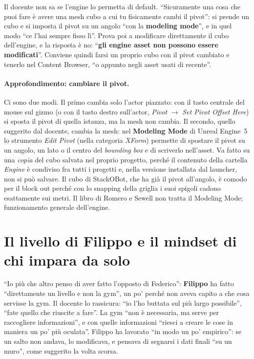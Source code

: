 Il docente non sa se l'engine lo permetta di default. ``Sicuramente una cosa che puoi fare è
avere una mesh cubo a cui tu fisicamente cambi il pivot'': si prende un cubo e si imposta il
pivot su un angolo ``con la \textbf{modeling mode}'', e in quel modo ``ce l'hai sempre fisso
lì''. Prova poi a modificare direttamente il cubo dell'engine, e la risposta è no: ``\textbf{gli
engine asset non possono essere modificati}''. Conviene quindi farsi un proprio cubo con il
pivot cambiato e tenerlo nel Content Browser, ``o appunto negli asset usati di recente''.

\paragraph{Approfondimento: cambiare il pivot.} Ci sono due modi. Il primo cambia solo
l'actor piazzato: con il tasto centrale del mouse sul gizmo (o con il tasto destro
sull'actor, \emph{Pivot} $\rightarrow$ \emph{Set Pivot Offset Here}) si sposta il pivot di
quella istanza, ma la mesh non cambia. Il secondo, quello suggerito dal docente, cambia la
mesh: nel \textbf{Modeling Mode} di Unreal Engine~5 lo strumento \emph{Edit Pivot} (nella
categoria \emph{XForm}) permette di spostare il pivot su un angolo, un
lato o il centro del \emph{bounding box} e di scriverlo nell'asset. Va fatto su una
\emph{copia} del cubo salvata nel proprio progetto, perché il contenuto della cartella
\emph{Engine} è condiviso fra tutti i progetti e, nella versione installata dal launcher,
non si può salvare. Il cubo di StackOBot, che ha già il pivot all'angolo, è comodo per il
block out perché con lo snapping della griglia i suoi spigoli cadono esattamente sui metri.
Il libro di Romero e Sewell non tratta il Modeling Mode; funzionamento generale
dell'engine.

\section{Il livello di Filippo e il mindset di chi impara da solo}
\label{ue14:sec:filippo}

``Io più che altro penso di aver fatto l'opposto di Federico'': \textbf{Filippo} ha fatto
``direttamente un livello e non la gym'', un po' perché non aveva capito a che cosa servisse
la gym. Il docente lo rassicura: ``io l'ho buttata sul più largo possibile'', ``fate quello
che riuscite a fare''. La gym ``non è necessaria, ma serve per raccogliere informazioni'', e
con quelle informazioni ``riesci a creare le cose in maniera un po' più oculata''. Filippo
ha lavorato ``in modo un po' empirico'': se un salto non andava, lo modificava, e pensava di
segnarsi i dati finali ``su un muro'', come suggerito la volta scorsa.

